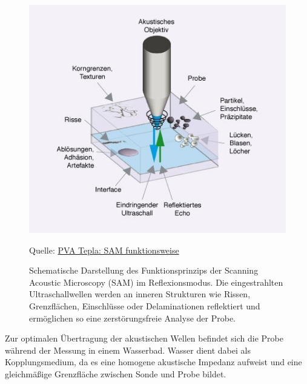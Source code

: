  \newpage
\vspace{0.2cm}
\begin{figure}
    \centering
    \includegraphics[scale=0.8]{Bilder/samtheorie}
    \caption{Schematische Darstellung des Funktionsprinzips der Scanning Acoustic Microscopy (SAM) im Reflexionsmodus. Die eingestrahlten Ultraschallwellen werden an inneren Strukturen wie Rissen, Grenzflächen, Einschlüsse oder Delaminationen reflektiert und ermöglichen so eine zerstörungsfreie Analyse der Probe.}
    \par Quelle: \href{https://www.pvatepla-lwt.com/technologien/funktionsweise-der-ultraschallmikroskopie/}{PVA Tepla: SAM funktionsweise}
    \vspace{0.2cm}
    \label{Abb.1: Schematische Darstellung des Funktionsprinzips der Scanning Acoustic Microscopy (SAM) im Reflexionsmodus. Die eingestrahlten Ultraschallwellen werden an inneren Strukturen wie Rissen, Grenzflächen, Einschlüsse oder Delaminationen reflektiert und ermöglichen so eine zerstörungsfreie Analyse der Probe. }
\end{figure} 
\vspace{0.2cm}
Zur optimalen Übertragung der akustischen Wellen befindet sich die Probe während der Messung in einem Wasserbad. Wasser dient dabei als Kopplungsmedium, da es eine homogene akustische Impedanz aufweist und eine gleichmäßige Grenzfläche zwischen Sonde und Probe bildet.
